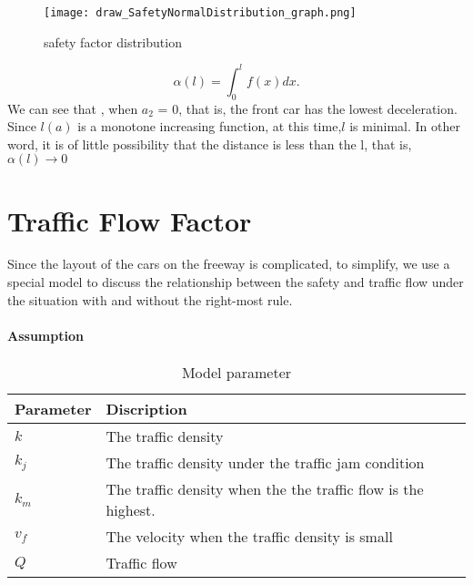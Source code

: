 \begin{figure}[h]
\small
\centering
\texttt{[image: draw\_SafetyNormalDistribution\_graph.png]}
\caption{safety factor distribution} \label{fig::safety factor distribution}
\end{figure}
\begin{displaymath}
\alpha(l) = \int_{0}^{l} f(x) dx.
\end{displaymath}
We can see that , when $a_2$ = 0, that is, the front car 
has the lowest deceleration. Since $l(a)$ is a monotone 
increasing function, at this time,$l$ is minimal. In other 
word, it is of little possibility that the distance is less 
than the l, that is, $\alpha(l) \rightarrow 0$                     


\section{Traffic Flow Factor}
Since the layout of the cars on the freeway is complicated, 
to simplify, we use a special model to discuss the 
relationship between the safety and traffic flow under the 
situation with and without the right-most rule.
\\
\paragraph{Assumption}


\begin{table}
\centering
\begin{tabular}{ll}
\hline
Parameter & Discription\\
\hline
$k$ & The traffic density\\
$k_j$ & The traffic density under the traffic jam condition\\
$k_m$ & The traffic density when the the traffic flow is the highest.\\
$v_f$ & The velocity when the traffic density is small \\
$Q$ & Traffic flow \\
\hline
\end{tabular}
\caption{Model parameter}
\end{table}


